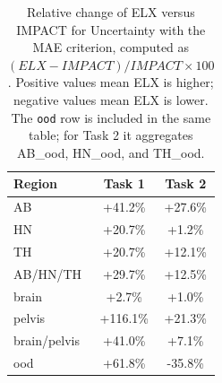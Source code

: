 \begin{table}[t]
\centering
\small
\setlength{\tabcolsep}{6pt}
\renewcommand{\arraystretch}{1.15}
\begin{tabular}{lcc}
\toprule
Region & Task 1 & Task 2 \\
\midrule
AB & +41.2\% & +27.6\% \\
HN & +20.7\% & +1.2\% \\
TH & +20.7\% & +12.1\% \\
AB/HN/TH & +29.7\% & +12.5\% \\
\addlinespace[0.25em]
\hline
\hline
\addlinespace[0.25em]
brain & +2.7\% & +1.0\% \\
pelvis & +116.1\% & +21.3\% \\
brain/pelvis & +41.0\% & +7.1\% \\
ood & +61.8\% & -35.8\% \\
\bottomrule
\end{tabular}
\caption{Relative change of ELX versus IMPACT for Uncertainty with the MAE criterion, computed as $(ELX-IMPACT)/IMPACT \times 100$. Positive values mean ELX is higher; negative values mean ELX is lower. The \texttt{ood} row is included in the same table; for Task 2 it aggregates AB\_ood, HN\_ood, and TH\_ood.}
\label{tab:cv_uncertainty_mae_percentage}
\end{table}
